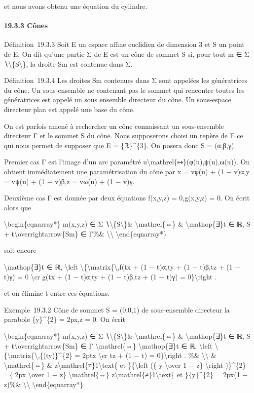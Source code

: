 \documentclass[]{article}
\begin{document}
et nous avons obtenu une équation du cylindre.

\paragraph{19.3.3 Cônes}

Définition~19.3.3 Soit E un espace affine euclidien de dimension 3 et S
un point de E. On dit qu'une partie Σ de E est un cône de sommet S si,
pour tout m ∈ Σ ∖\textbackslash{}\{S\textbackslash{}\}, la droite Sm est
contenue dans Σ.

Définition~19.3.4 Les droites Sm contenues dans Σ sont appelées les
génératrices du cône. Un sous-ensemble ne contenant pas le sommet qui
rencontre toutes les génératrices est appelé un sous ensemble directeur
du cône. Un sous-espace directeur plan est appelé une base du cône.

On est parfois amené à rechercher un cône connaissant un sous-ensemble
directeur Γ et le sommet S du cône. Nous supposerons choisi un repère de
E ce qui nous permet de supposer que E = \{ℝ\}\^{}\{3\}. On posera donc
S = (α,β,γ).

Premier cas Γ est l'image d'un arc paramétré
u\textbackslash{}mathrel\{↦\}(φ(u),ψ(u),ω(u)). On obtient immédiatement
une paramétrisation du cône par x = vφ(u) + (1 − v)α,y = vψ(u) + (1 −
v)β,z = vω(u) + (1 − v)γ.

Deuxième cas Γ est donnée par deux équations f(x,y,z) = 0,g(x,y,z) = 0.
On écrit alors que

\textbackslash{}begin\{eqnarray*\} m(x,y,z) ∈ Σ
∖\textbackslash{}\{S\textbackslash{}\}\& \textbackslash{}mathrel\{⇔\} \&
\textbackslash{}mathop\{∃\}t ∈ ℝ, S +
t\textbackslash{}overrightarrow\{Sm\} ∈ Γ\%\&
\textbackslash{}\textbackslash{} \textbackslash{}end\{eqnarray*\}

soit encore

\textbackslash{}mathop\{∃\}t ∈ ℝ, \textbackslash{}left
\textbackslash{}\{\textbackslash{}matrix\{\textbackslash{},f(tx + (1 −
t)α,ty + (1 − t)β,tz + (1 − t)γ) = 0 \textbackslash{}cr g(tx + (1 −
t)α,ty + (1 − t)β,tz + (1 − t)γ) = 0\}\textbackslash{}right .

et on élimine t entre ces équations.

Exemple~19.3.2 Cône de sommet S = (0,0,1) de sous-ensemble directeur la
parabole \{y\}\^{}\{2\} = 2px,z = 0. On écrit

\textbackslash{}begin\{eqnarray*\} m(x,y,z) ∈ Σ
∖\textbackslash{}\{S\textbackslash{}\}\& \textbackslash{}mathrel\{⇔\} \&
\textbackslash{}mathop\{∃\}t ∈ ℝ, S +
t\textbackslash{}overrightarrow\{Sm\} ∈ Γ \textbackslash{}mathrel\{⇔\}
\textbackslash{}mathop\{∃\}t ∈ ℝ, \textbackslash{}left
\textbackslash{}\{\textbackslash{}matrix\{\textbackslash{},\{(ty)\}\^{}\{2\}
= 2ptx \textbackslash{}cr tz + (1 − t) = 0\}\textbackslash{}right . \%\&
\textbackslash{}\textbackslash{} \& \textbackslash{}mathrel\{⇔\} \&
z\textbackslash{}mathrel\{≠\}1\textbackslash{}text\{ et
\}\{\textbackslash{}left (\{ y \textbackslash{}over 1 − z\}
\textbackslash{}right )\}\^{}\{2\} =\{ 2px \textbackslash{}over 1 − z\}
\textbackslash{}mathrel\{⇔\}
z\textbackslash{}mathrel\{≠\}1\textbackslash{}text\{ et \}\{y\}\^{}\{2\}
= 2px(1 − z)\%\& \textbackslash{}\textbackslash{}
\textbackslash{}end\{eqnarray*\}
\end{document}
